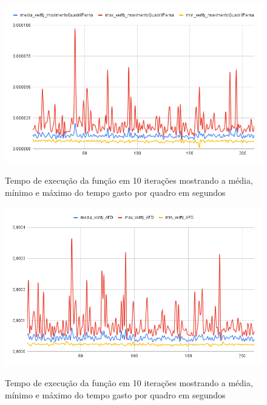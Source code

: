 \begin{figure}[H]
	\centering
	\caption{Tempo de execução da função  em 10 iterações mostrando a média, mínimo e máximo do tempo gasto por quadro em segundos}
	\includegraphics[scale=0.55]{figuras/grafico/movimentoQuadril.png}
	\label{graf:G9}
\end{figure}


\begin{figure}[H]
	\centering
	\caption{Tempo de execução da função  em 10 iterações mostrando a média, mínimo e máximo do tempo gasto por quadro em segundos}
	\includegraphics[scale=0.55]{figuras/grafico/verify_AFD.png}
	\label{graf:G10}
\end{figure}


